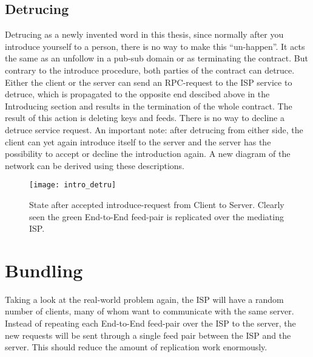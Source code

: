 \subsection{Detrucing}
Detrucing as a newly invented word in this thesis, since normally after you introduce yourself to a person, there is no way to make this “un-happen”. It acts the same as an unfollow in a pub-sub domain or as terminating the contract. But contrary to the introduce procedure, both parties of the contract can detruce.
Either the client or the server can send an RPC-request to the ISP service to detruce, which is propagated to the opposite end descibed above in the Introducing section and results in the termination of the whole contract. The result of this action is deleting keys and feeds. There is no way to decline a detruce service request. An important note: after detrucing from either side, the client can yet again introduce itself to the server and the server has the possibility to accept or decline the introduction again.
A new diagram of the network can be derived using these descriptions.
\begin{figure}
    \centering
    \texttt{[image: intro\_detru]}
    \caption{State after accepted introduce-request from Client to Server. Clearly seen the green End-to-End feed-pair is replicated over the mediating ISP.}
    \label{fig:contract_cli_isp}
\end{figure}

\pagebreak

\section{Bundling}
Taking a look at the real-world problem again, the ISP will have a random number of clients, many of whom want to communicate with the same server. Instead of repeating each End-to-End feed-pair over the ISP to the server, the new requests will be sent through a single feed pair between the ISP and the server. This should reduce the amount of replication work enormously.

